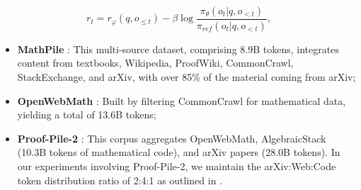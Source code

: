 \begin{equation}
    r_{t} = r_\varphi(q, o_{\le t}) - \beta \log\frac{\pi_{\theta}(o_{t}|q, o_{<t})}{\pi_{ref}(o_{t}|q, o_{<t})},
\label{eq:PPO-reward}
\end{equation}

\begin{itemize}[topsep=0pt]
    \item \textbf{MathPile} \citep{mathpile}: This multi-source dataset, comprising 8.9B tokens, integrates content from textbooks, Wikipedia, ProofWiki, CommonCrawl, StackExchange, and arXiv, with over 85\% of the material coming from arXiv;
    \item \textbf{OpenWebMath} \citep{openwebmath}: Built by filtering CommonCrawl for mathematical data, yielding a total of 13.6B tokens;
    \item \textbf{Proof-Pile-2} \citep{llemma}: This corpus aggregates OpenWebMath, AlgebraicStack (10.3B tokens of mathematical code), and arXiv papers (28.0B tokens). In our experiments involving Proof-Pile-2, we maintain the arXiv:Web:Code token distribution ratio of 2:4:1 as outlined in \cite{llemma}.
\end{itemize}

